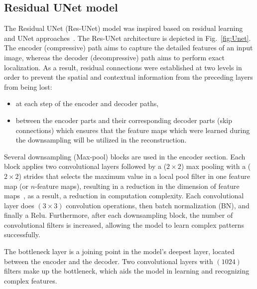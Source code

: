 \subsection{Residual UNet model}
The Residual UNet (Res-UNet) model was inspired based on residual learning~\cite{He2016} and UNet approaches~\cite{Ronneberger2015}.
The Res-UNet architecture is depicted in Fig.~\ref{fig:Unet}.
The encoder (compressive) path aims to capture the detailed features of an input image, whereas the decoder (decompressive) path aims to perform exact localization.
As a result, residual connections were established at two levels in order to prevent the spatial and contextual information from the preceding layers from being lost:

\begin{itemize}
	\item at each step of the encoder and decoder paths,
	\item between the encoder parts and their corresponding decoder parts (skip connections) which ensures that the feature maps which were learned during the downsampling will be utilized in the reconstruction. 
\end{itemize}

Several downsampling (Max-pool) blocks are used in the encoder section.
Each block applies two convolutional layers followed by a (\(2\times2\)) max pooling with a (\(2\times2\)) strides that selects the maximum value in a local pool filter in one feature map (or \(n\)-feature maps), resulting in a reduction in the dimension of feature maps~\cite{Lecun2015}, as a result, a reduction in computation complexity.
Each convolutional layer does \((3\times3)\) convolution operations, then batch normalization (BN), and finally a Relu.
Furthermore, after each downsampling block, the number of convolutional filters is increased, allowing the model to learn complex patterns successfully.

The bottleneck layer is a joining point in the model's deepest layer, located between the encoder and the decoder.
Two convolutional layers with \((1024)\) filters make up the bottleneck, which aids the model in learning and recognizing complex features.


